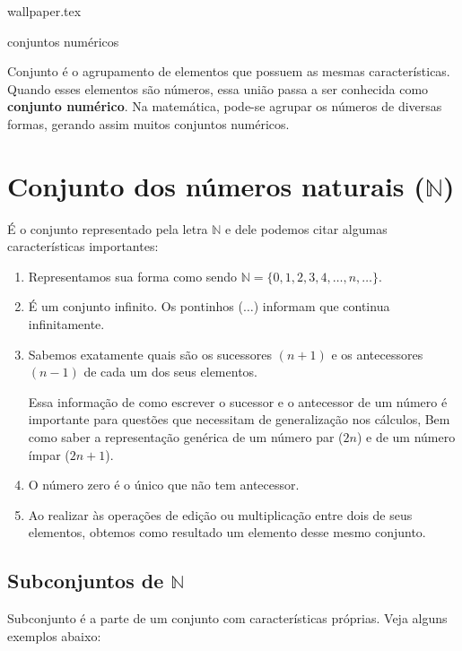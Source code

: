 \documentclass[10pt]{article}
\begin{document}
    {wallpaper.tex} %
        \begin{center}
            {\LARGE {\sc conjuntos numéricos}}
        \end{center}

\begin{definicao}
Conjunto é o agrupamento de elementos que possuem as mesmas características. Quando esses elementos são números, essa união passa a ser conhecida como \textbf{conjunto numérico}. Na matemática, pode-se agrupar os números de diversas formas, gerando assim muitos conjuntos numéricos.
\end{definicao}

\section*{Conjunto dos números naturais (\( \mathbb{N} \))}
É o conjunto representado pela letra \( \mathbb{N}\) e dele podemos citar algumas características importantes:

    \begin{enumerate}[label=\textbf{(\Roman*)}]
        \item Representamos sua forma como sendo \( \mathbb{N} = \{0, 1, 2, 3, 4, \ldots, n, \ldots\}\).
        \item É um conjunto infinito. Os pontinhos (\(\ldots\)) informam que continua infinitamente.
        \item Sabemos exatamente quais são os sucessores \((n+1)\) e os antecessores \((n-1)\) de cada um dos seus elementos.
        
        \begin{obs}
        Essa informação de como escrever o sucessor e o antecessor de um número é importante para questões que necessitam de generalização nos cálculos, Bem como saber a representação genérica de um número par (\(2n\)) e de um número ímpar (\(2n+1\)).
        \end{obs}
        \item O número zero é o único que não tem antecessor.
        \item Ao realizar às operações de edição ou multiplicação entre dois de seus elementos, obtemos como resultado um elemento desse mesmo conjunto.
    \end{enumerate}
\subsection*{Subconjuntos de \( \mathbb{N} \)}
Subconjunto é a parte de um conjunto com características próprias. Veja alguns exemplos abaixo:
\end{document}
